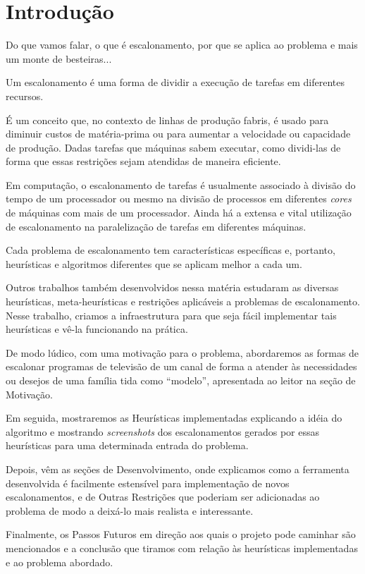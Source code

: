 \section{Introdução}

Do que vamos falar, o que é escalonamento, por que se aplica ao problema e mais um monte de besteiras...

Um escalonamento é uma forma de dividir a execução de tarefas em diferentes recursos. 

É um conceito que, no contexto de linhas de produção fabris, é usado para diminuir custos de matéria-prima ou para aumentar a velocidade ou capacidade de produção. Dadas tarefas que máquinas sabem executar, como dividi-las de forma que essas restrições sejam atendidas de maneira eficiente.

Em computação, o escalonamento de tarefas é usualmente associado à divisão do tempo de um processador ou mesmo na divisão de processos em diferentes \textit{cores} de máquinas com mais de um processador. Ainda há a extensa e vital utilização de escalonamento na paralelização de tarefas em diferentes máquinas.

Cada problema de escalonamento tem características específicas e, portanto, heurísticas e algoritmos diferentes que se aplicam melhor a cada um.

Outros trabalhos também desenvolvidos nessa matéria estudaram as diversas heurísticas, meta-heurísticas e restrições aplicáveis a problemas de escalonamento. Nesse trabalho, criamos a infraestrutura para que seja fácil implementar tais heurísticas e vê-la funcionando na prática.

De modo lúdico, com uma motivação para o problema, abordaremos as formas de escalonar programas de televisão de um canal de forma a atender às necessidades ou desejos de uma família tida como ``modelo'', apresentada ao leitor na seção de Motivação.

Em seguida, mostraremos as Heurísticas implementadas explicando a idéia do algoritmo e mostrando \textit{screenshots} dos escalonamentos gerados por essas heurísticas para uma determinada entrada do problema.

Depois, vêm as seções de Desenvolvimento, onde explicamos como a ferramenta desenvolvida é facilmente estensível para implementação de novos escalonamentos, e de Outras Restrições que poderiam ser adicionadas ao problema de modo a deixá-lo mais realista e interessante.

Finalmente, os Passos Futuros em direção aos quais o projeto pode caminhar são mencionados e a conclusão que tiramos com relação às heurísticas implementadas e ao problema abordado.
